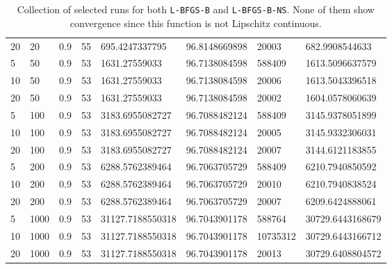 \begin{table}
\begin{center}
\begin{tabular}{|l|l|l|l|l|l|l|l|}
      20 & 20 & 0.9 & 55 & 695.4247337795 & 96.8148669898 & 20003 & 682.9908544633\\
      5 & 50 & 0.9 & 53 & 1631.27559033 & 96.7138084598 & 588409 & 1613.5096637579\\
      10 & 50 & 0.9 & 53 & 1631.27559033 & 96.7138084598 & 20006 & 1613.5043396518\\
      20 & 50 & 0.9 & 53 & 1631.27559033 & 96.7138084598 & 20002 & 1604.0578060639\\
      5 & 100 & 0.9 & 53 & 3183.6955082727 & 96.7088482124 & 588409 & 3145.9378051899\\
      10 & 100 & 0.9 & 53 & 3183.6955082727 & 96.7088482124 & 20005 & 3145.9332306031\\
      20 & 100 & 0.9 & 53 & 3183.6955082727 & 96.7088482124 & 20007 & 3144.6121183855\\
      5 & 200 & 0.9 & 53 & 6288.5762389464 & 96.7063705729 & 588409 & 6210.7940850592\\
      10 & 200 & 0.9 & 53 & 6288.5762389464 & 96.7063705729 & 20010 & 6210.7940838524\\
      20 & 200 & 0.9 & 53 & 6288.5762389464 & 96.7063705729 & 20007 & 6209.6424888061\\
      5 & 1000 & 0.9 & 53 & 31127.7188550318 & 96.7043901178 & 588764 & 30729.6443168679\\
      10 & 1000 & 0.9 & 53 & 31127.7188550318 & 96.7043901178 & 10735312 & 30729.6443166712\\
      20 & 1000 & 0.9 & 53 & 31127.7188550318 & 96.7043901178 & 20013 & 30729.6408804572\\
      \hline
    \end{tabular}
    \caption[Selected Runs $p = 0.9$]{Collection of selected runs for both \texttt{L-BFGS-B} and \texttt{L-BFGS-B-NS}. None of them show convergence since this function is not Lipschitz continuous.}
    \label{p09}
  \end{center}
\end{table}
\pagebreak
\pagebreak
\clearpage
